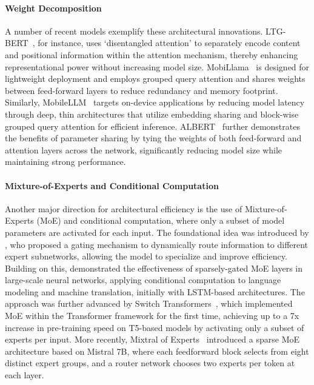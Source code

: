 \paragraph{Weight Decomposition}
A number of recent models exemplify these architectural innovations. LTG-BERT~\citep{samuel2023ltgbert}, for instance, uses `disentangled attention' to separately encode content and positional information within the attention mechanism, thereby enhancing representational power without increasing model size. MobiLlama~\citep{thawakar2024mobillama} is designed for lightweight deployment and employs grouped query attention and shares weights between feed-forward layers to reduce redundancy and memory footprint. Similarly, MobileLLM~\citep{liu2024mobilellm} targets on-device applications by reducing model latency through deep, thin architectures that utilize embedding sharing and block-wise grouped query attention for efficient inference. ALBERT~\citep{lan2019albert} further demonstrates the benefits of parameter sharing by tying the weights of both feed-forward and attention layers across the network, significantly reducing model size while maintaining strong performance.

\paragraph{Mixture-of-Experts and Conditional Computation}
Another major direction for architectural efficiency is the use of Mixture-of-Experts (MoE) and conditional computation, where only a subset of model parameters are activated for each input. The foundational idea was introduced by \citet{jacobs1991adaptive}, who proposed a gating mechanism to dynamically route information to different expert subnetworks, allowing the model to specialize and improve efficiency. Building on this, \citet{shazeer2017outrageously} demonstrated the effectiveness of sparsely-gated MoE layers in large-scale neural networks, applying conditional computation to language modeling and machine translation, initially with LSTM-based architectures. The approach was further advanced by Switch Transformers~\citep{fedus2021switch}, which implemented MoE within the Transformer framework for the first time, achieving up to a 7x increase in pre-training speed on T5-based models by activating only a subset of experts per input. More recently, Mixtral of Experts~\citep{jiang2024mixtral} introduced a sparse MoE architecture based on Mistral 7B, where each feedforward block selects from eight distinct expert groups, and a router network chooses two experts per token at each layer. %

